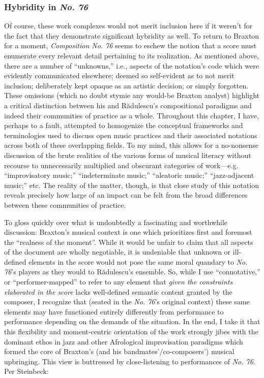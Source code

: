 
    \subsubsection{Hybridity in \textit{No. 76}}

        Of course, these work complexes would not merit inclusion here if it weren't for the fact that they demonstrate significant hybridity as well. To return to Braxton for a moment, \textit{Composition No. 76} seems to eschew the notion that a score must enumerate every relevant detail pertaining to its realization. As mentioned above, there are a number of ``unknowns,'' i.e., aspects of the notation's code which were evidently communicated elsewhere; deemed so self-evident as to not merit inclusion; deliberately kept opaque as an artistic decision; or simply forgotten. These omissions (which no doubt stymie any would-be Braxton analyst) highlight a critical distinction between his and R\u{a}dulescu's compositional paradigms and indeed their communities of practice as a whole. Throughout this chapter, I have, perhaps to a fault, attempted to homogenize the conceptual frameworks and terminologies used to discuss open music practices and their associated notations across both of these overlapping fields. To my mind, this allows for a no-nonsense discussion of the brute realities of the various forms of musical literacy without recourse to unnecessarily multiplied and obscurant categories of work---e.g. ``improvisatory music;'' ``indeterminate music;'' ``aleatoric music;'' ``jazz-adjacent music;'' etc. The reality of the matter, though, is that close study of this notation reveals precisely how large of an impact can be felt from the broad differences between these communities of practice.

        To gloss quickly over what is undoubtedly a fascinating and worthwhile discussion: Braxton's musical context is one which prioritizes first and foremost the ``realness of the moment''.\autocite[149]{Braxton_1988} While it would be unfair to claim that all aspects of the document are wholly negotiable, it is undeniable that unknown or ill-defined elements in the score would not pose the same moral quandary to \textit{No. 76}'s players as they would to R\u{a}dulescu's ensemble. So, while I use ``connotative,'' or ``performer-mapped'' to refer to any element that \textit{given the constraints elaborated in the score} lacks well-defined semantic content granted by the composer, I recognize that (seated in the \textit{No. 76}'s original context) these same elements may have functioned entirely differently from performance to performance depending on the demands of the situation. In the end, I take it that this flexibility and moment-centric orientation of the work strongly jibes with the dominant ethos in jazz and other Afrological improvisation paradigms which formed the core of Braxton's (and his bandmates'/co-composers') musical upbringing. This view is buttressed by close-listening to performances of \textit{No. 76}. Per Steinbeck:

